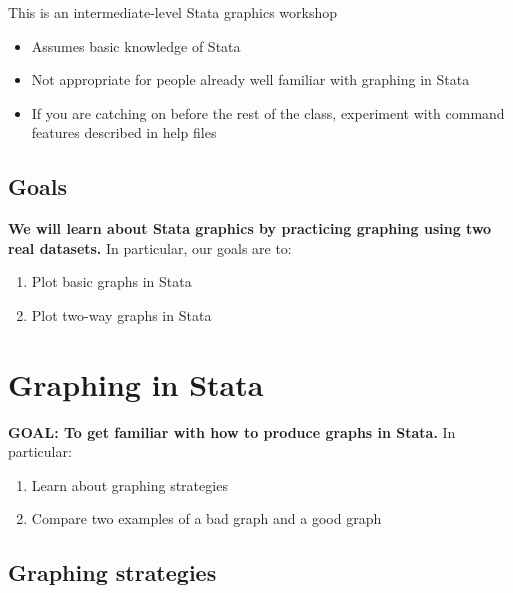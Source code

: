 \documentclass[
]{book}
\providecommand{\tightlist}{%
  \setlength{\itemsep}{0pt}\setlength{\parskip}{0pt}}
\begin{document}
This is an intermediate-level Stata graphics workshop

\begin{itemize}
\tightlist
\item
  Assumes basic knowledge of Stata
\item
  Not appropriate for people already well familiar with graphing in Stata
\item
  If you are catching on before the rest of the class, experiment with command features described in help files
\end{itemize}

\hypertarget{goals-8}{%
\subsection{Goals}\label{goals-8}}

\begin{alert}

\textbf{We will learn about Stata graphics by practicing graphing using two real datasets.} In particular, our goals are to:

\begin{enumerate}
\def\labelenumi{\arabic{enumi}.}
\tightlist
\item
  Plot basic graphs in Stata
\item
  Plot two-way graphs in Stata
\end{enumerate}

\end{alert}

\hypertarget{graphing-in-stata}{%
\section{Graphing in Stata}\label{graphing-in-stata}}

\begin{alert}

\textbf{GOAL: To get familiar with how to produce graphs in Stata.} In particular:

\begin{enumerate}
\def\labelenumi{\arabic{enumi}.}
\tightlist
\item
  Learn about graphing strategies
\item
  Compare two examples of a bad graph and a good graph
\end{enumerate}

\end{alert}

\hypertarget{graphing-strategies}{%
\subsection{Graphing strategies}\label{graphing-strategies}}
\end{document}
